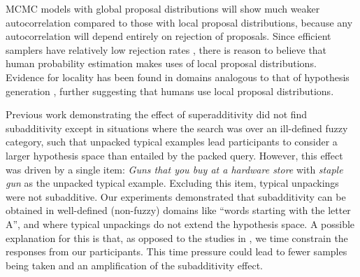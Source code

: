 MCMC models with global proposal distributions will show much weaker autocorrelation compared to those with local proposal distributions, because any autocorrelation will depend entirely on rejection of proposals. Since efficient samplers have relatively low rejection rates \citep{robert13}, there is reason to believe that human probability estimation makes uses of local proposal distributions. Evidence for locality has been found in domains analogous to that of hypothesis generation \citep{abbott2015random,smith2013multiply}, further suggesting that humans use local proposal distributions.


Previous work demonstrating the effect of superadditivity \citep{super} did not find subadditivity except in situations where the search was over an ill-defined fuzzy category, such that unpacked typical examples lead participants to consider a larger hypothesis space than entailed by the packed query. However, this effect was driven by a single item: \textit{Guns that you buy at a hardware store} with \textit{staple gun} as the unpacked typical example. Excluding this item, typical unpackings were not subadditive. Our experiments demonstrated that subadditivity can be obtained in well-defined (non-fuzzy) domains like ``words starting with the letter A'', and where typical unpackings do not extend the hypothesis space. A possible explanation for this is that, as opposed to the studies in \cite{super}, we time constrain the responses from our participants. This time pressure could lead to fewer samples being taken and an amplification of the subadditivity effect.




